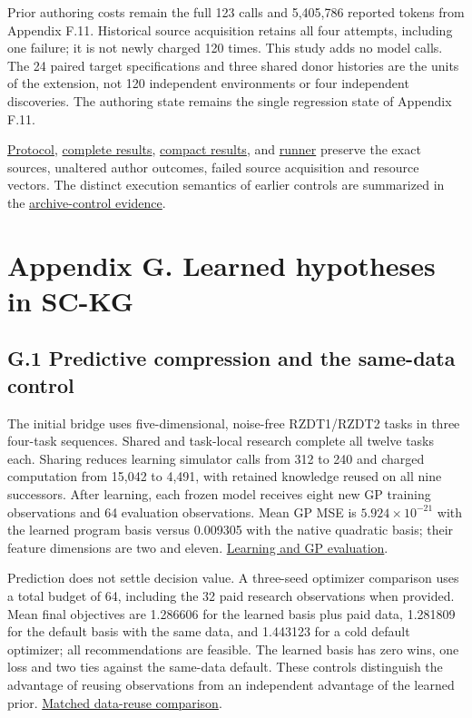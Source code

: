 \documentclass[11pt,a4paper]{article}
\begin{document}
Prior authoring costs remain the full 123 calls and 5,405,786 reported tokens from Appendix F.11. Historical source acquisition retains all four attempts, including one failure; it is not newly charged 120 times. This study adds no model calls. The 24 paired target specifications and three shared donor histories are the units of the extension, not 120 independent environments or four independent discoveries. The authoring state remains the single regression state of Appendix F.11.


\hyperlink{artifact-100}{Protocol}, \hyperlink{artifact-101}{complete results}, \hyperlink{artifact-102}{compact results}, and \hyperlink{artifact-103}{runner} preserve the exact sources, unaltered author outcomes, failed source acquisition and resource vectors. The distinct execution semantics of earlier controls are summarized in the \hyperlink{artifact-104}{archive-control evidence}.


\section*{Appendix G. Learned hypotheses in SC-KG}

\subsection*{G.1 Predictive compression and the same-data control}

The initial bridge uses five-dimensional, noise-free RZDT1/RZDT2 tasks in three
four-task sequences. Shared and task-local research complete all twelve tasks
each. Sharing reduces learning simulator calls from 312 to 240 and charged
computation from 15,042 to 4,491, with retained knowledge reused on all nine
successors. After learning, each frozen model receives eight new GP training
observations and 64 evaluation observations. Mean GP MSE is
\(5.924\times10^{-21}\) with the learned program basis versus 0.009305 with the
native quadratic basis; their feature dimensions are two and eleven.
\hyperlink{artifact-105}{Learning and GP evaluation}.


Prediction does not settle decision value. A three-seed optimizer comparison
uses a total budget of 64, including the 32 paid research observations when
provided. Mean final objectives are 1.286606 for the learned basis plus paid
data, 1.281809 for the default basis with the same data, and 1.443123 for a
cold default optimizer; all recommendations are feasible. The learned basis
has zero wins, one loss and two ties against the same-data default. These
controls distinguish the advantage of reusing observations from an independent
advantage of the learned prior.
\hyperlink{artifact-106}{Matched data-reuse comparison}.
\end{document}
